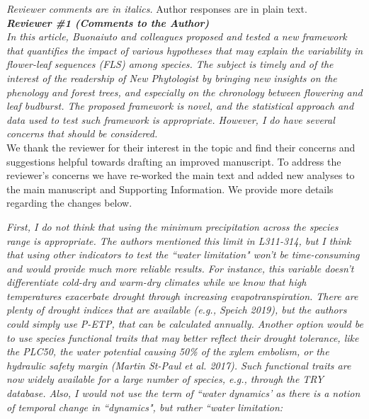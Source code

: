 \documentclass{article}[11pt]
\begin{document}
\setlength\parindent{0pt}



\emph{Reviewer comments are in italics.} Author responses are in plain text.\\


\emph{{\bf Reviewer \#1 (Comments to the Author)}}\\

\emph{In this article, Buonaiuto and colleagues proposed and tested a new framework that quantifies the impact of various hypotheses that may explain the variability in flower-leaf sequences (FLS) among species. The subject is timely and of the interest of the readership of New Phytologist by bringing new insights on the phenology and forest trees, and especially on the chronology between flowering and leaf budburst. The proposed framework is novel, and the statistical approach and data used to test such framework is appropriate. However, I do have several concerns that should be considered.}\\

We thank the reviewer for their interest in the topic and find their concerns and suggestions helpful towards drafting an improved manuscript. To address the reviewer's concerns we have re-worked the main text and added new analyses to the main manuscript and Supporting Information. We provide more details regarding the changes below.

\emph{First, I do not think that using the minimum precipitation across the species range is appropriate. The authors mentioned this limit in L311-314, but I think that using other indicators to test the ``water limitation" won't be time-consuming and would provide much more reliable results. For instance, this variable doesn't differentiate cold-dry and warm-dry climates while we know that high temperatures exacerbate drought through increasing evapotranspiration. There are plenty of drought indices that are available (e.g., Speich 2019), but the authors could simply use P-ETP, that can be calculated annually. Another option would be to use species functional traits that may better reflect their drought tolerance, like the PLC50, the water potential causing 50\% of the xylem embolism, or the hydraulic safety margin (Martin St-Paul et al. 2017). Such functional traits are now widely available for a large number of species, e.g., through the TRY database. Also, I would not use the term of ``water dynamics' as there is a notion of temporal change in ``dynamics", but rather ``water limitation:}\\
\end{document}
